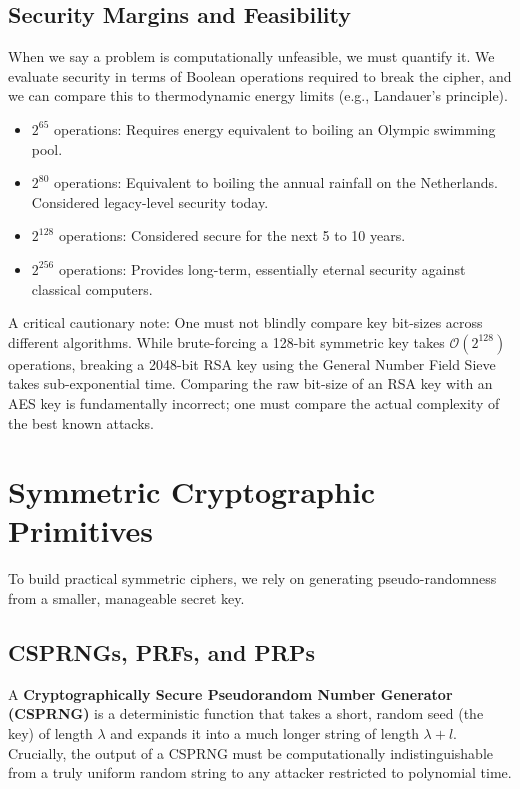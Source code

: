 \subsection{Security Margins and Feasibility}
When we say a problem is computationally unfeasible, we must quantify it. We evaluate security in terms of Boolean operations required to break the cipher, and we can compare this to thermodynamic energy limits (e.g., Landauer's principle). 
\begin{itemize}
    \item $2^{65}$ operations: Requires energy equivalent to boiling an Olympic swimming pool.
    \item $2^{80}$ operations: Equivalent to boiling the annual rainfall on the Netherlands. Considered legacy-level security today.
    \item $2^{128}$ operations: Considered secure for the next 5 to 10 years.
    \item $2^{256}$ operations: Provides long-term, essentially eternal security against classical computers.
\end{itemize}

A critical cautionary note: One must not blindly compare key bit-sizes across different algorithms. While brute-forcing a 128-bit symmetric key takes $\mathcal{O}(2^{128})$ operations, breaking a 2048-bit RSA key using the General Number Field Sieve takes sub-exponential time. Comparing the raw bit-size of an RSA key with an AES key is fundamentally incorrect; one must compare the actual complexity of the best known attacks.

\section{Symmetric Cryptographic Primitives}

To build practical symmetric ciphers, we rely on generating pseudo-randomness from a smaller, manageable secret key.

\subsection{CSPRNGs, PRFs, and PRPs}
A \textbf{Cryptographically Secure Pseudorandom Number Generator (CSPRNG)} is a deterministic function that takes a short, random seed (the key) of length $\lambda$ and expands it into a much longer string of length $\lambda + l$. Crucially, the output of a CSPRNG must be computationally indistinguishable from a truly uniform random string to any attacker restricted to polynomial time.

